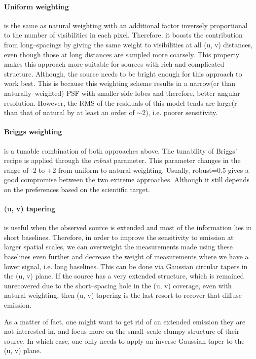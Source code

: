 \documentclass[a4wide,12pt]{book}
\begin{document}
{\paragraph*{Uniform weighting} is the same as natural weighting with an additional factor inversely proportional to the number of visibilities in each pixel. Therefore, it boosts the contribution from long--spacings by giving the same weight to visibilities at all (u, v) distances, even though those at long distances are sampled more coarsely. This property makes this approach more suitable for sources with rich and complicated structure. Although, the source needs to be bright enough for this approach to work best. This is because this weighting scheme results in a narrow(er than naturally--weighted) PSF with smaller side lobes and therefore, better angular resolution. However, the RMS of the residuals of this model tends are large(r than that of natural by at least an order of $\sim 2$), i.e. poorer sensitivity.

\paragraph*{Briggs weighting} is a tunable combination of both approaches above. The tunability of Briggs' recipe is applied through the \emph{robust} parameter. This parameter changes in the range of -2 to +2 from uniform to natural weighting. Usually, robust=0.5 gives a good compromise between the two extreme approaches. Although it still depends on the preferences based on the scientific target.

\paragraph*{(u, v) tapering} is useful when the observed source is extended and most of the information lies in short baselines. Therefore, in order to improve the sensitivity to emission at larger spatial scales, we can overweight the measurements made using these baselines even further and decrease the weight of measurements where we have a lower signal, i.e. long baselines. This can be done via Gaussian circular tapers in the (u, v) plane. If the source has a very extended structure, which is remained unrecovered due to the short--spacing hole in the (u, v) coverage, even with natural weighting, then (u, v) tapering is the last resort to recover that diffuse emission. 

As a matter of fact, one might want to get rid of an extended emission they are not interested in, and focus more on the small--scale clumpy structure of their source. In which case, one only needs to apply an inverse Gaussian taper to the (u, v) plane.

}
\end{document}
